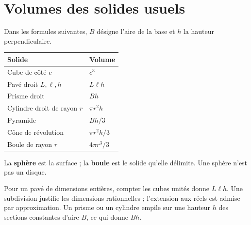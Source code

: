 \documentclass[../cours_3e.tex]{subfiles}
\begin{document}
\section{Volumes des solides usuels}
Dans les formules suivantes, $B$ désigne l'aire de la base et $h$ la hauteur perpendiculaire.
\begin{center}
\begin{tabularx}{\textwidth}{lX}
\toprule Solide & Volume\\\midrule
Cube de côté $c$ & $c^3$\\
Pavé droit $L,\ell,h$ & $L\ell h$\\
Prisme droit & $Bh$\\
Cylindre droit de rayon $r$ & $\pi r^2h$\\
Pyramide & $Bh/3$\\
Cône de révolution & $\pi r^2h/3$\\
Boule de rayon $r$ & $4\pi r^3/3$\\\bottomrule
\end{tabularx}
\end{center}
La \textbf{sphère} est la surface ; la \textbf{boule} est le solide qu'elle délimite. Une sphère n'est pas un disque.

\begin{demonstration}
Pour un pavé de dimensions entières, compter les cubes unités donne $L\ell h$. Une subdivision justifie les dimensions rationnelles ; l'extension aux réels est admise par approximation. Un prisme ou un cylindre empile sur une hauteur $h$ des sections constantes d'aire $B$, ce qui donne $Bh$.
\end{demonstration}
\end{document}
